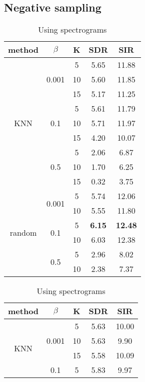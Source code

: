 \documentclass[master,final,11pt]{iscs-thesis}
\begin{document}
\subsection{Negative sampling}
\label{NS}

\begin{table}
\begin{subtable}{.5\linewidth}
\centering
\begin{tabular}{c|c|c|c|c}
method & $\beta$ & K & SDR & SIR \\ 
\hline
\multirow{9}{*}{KNN}  & \multirow{3}{*}{0.001} & 5 & 5.65 & 11.88 \\ 
\cline{3-5}
 &  & 10 & 5.60 & 11.85 \\
\cline{3-5}
 &  & 15 & 5.17 & 11.25 \\
\cline{2-5}
 & \multirow{3}{*}{0.1} & 5 & 5.61 & 11.79 \\
\cline{3-5}
 &  & 10 & 5.71 & 11.97 \\
\cline{3-5}
 &  & 15 & 4.20 & 10.07 \\
\cline{2-5}
 & \multirow{3}{*}{0.5} & 5 & 2.06 & 6.87 \\
\cline{3-5}
 &  & 10 & 1.70 & 6.25 \\
\cline{3-5}
 &  & 15 & 0.32 & 3.75 \\
\hline
\multirow{9}{*}{random}  & \multirow{2}{*}{0.001} & 5 & 5.74 & 12.06 \\ 
\cline{3-5}
 &  & 10 & 5.55 & 11.80 \\
\cline{2-5}
 & \multirow{2}{*}{0.1} & 5 & \textbf{6.15} & \textbf{12.48} \\
\cline{3-5}
 &  & 10 & 6.03 & 12.38 \\
\cline{2-5}
 & \multirow{2}{*}{0.5} & 5 & 2.96 & 8.02 \\
\cline{3-5}
 &  & 10 & 2.38 & 7.37 \\
\hline
\end{tabular}
\caption{Using spectrograms}
\label{table:SCE100NS}
\end{subtable}%
\begin{subtable}{.5\linewidth}
\centering
\begin{tabular}{c|c|c|c|c}
method & $\beta$ & K & SDR & SIR \\ 
\hline
\multirow{9}{*}{KNN}  & \multirow{3}{*}{0.001} & 5 & 5.63 & 10.00 \\ 
\cline{3-5}
 &  & 10 & 5.63 & 9.90 \\
\cline{3-5}
 &  & 15 & 5.58 & 10.09 \\
\cline{2-5}
 & \multirow{3}{*}{0.1} & 5 & 5.83 & 9.97 \\

\end{tabular}
\end{subtable}
\end{table}
\end{document}
